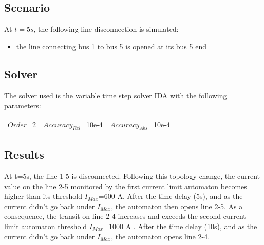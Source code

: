 \documentclass[a4paper, 12pt]{report}
\begin{document}
\subsection{Scenario}
At $t=5s$, the following line disconnection is simulated:
\begin{itemize}
\item{the line connecting bus 1 to bus 5 is opened at its bus 5 end}
\end{itemize}

\subsection{Solver}
The solver used is the variable time step solver IDA with the following parameters:
\begin{center}
\begin{tabular}{l|l|l}
   $Order$=2 & $Accuracy_{Rel}$=10e-4 & $Accuracy_{Abs}$=10e-4 \\
\end{tabular}
\end{center}


\newpage
\subsection{Results}

At t=5s, the line 1-5 is disconnected. Following this topology change, the current value on the line 2-5 monitored by the first current limit automaton becomes higher than its threshold $I_{Max}$=600 A. After the time delay (5s), and as the current didn't go back under $I_{Max}$, the automaton then opens line 2-5.
As a consequence, the transit on line 2-4 increases and exceeds the second current limit automaton threshold $I_{Max}$=1000 A . After the time delay (10s), and as the current didn't go back under $I_{Max}$, the automaton opens line 2-4. \\
\end{document}

